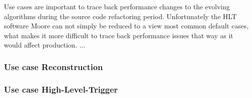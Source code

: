\documentclass[a4paper]{jpconf}
\begin{document}
Use cases are important to trace back performance changes to the evolving algorithms during the source code refactoring period. Unfortunately the HLT software Moore can not simply be reduced to a view most common default cases, what makes it more difficult to trace back performance issues that way as it would affect production. ...   

\subsubsection{Use case Reconstruction}
\label{sec:use_case_rec}

\subsubsection{Use case High-Level-Trigger}
\label{sec:use_case_hlt}
\end{document}
